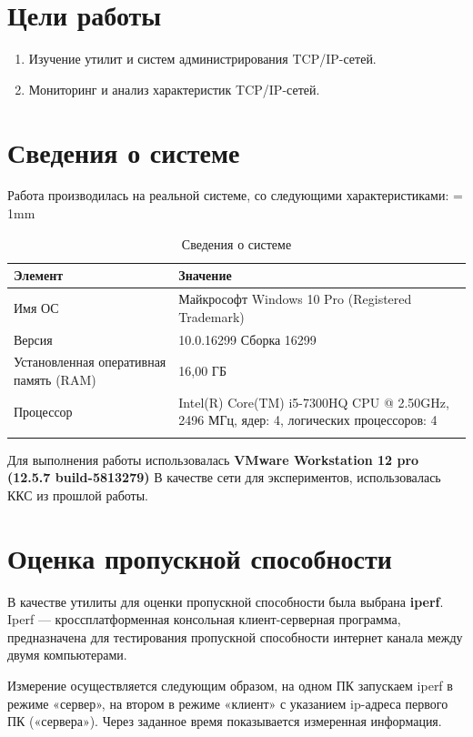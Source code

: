\documentclass[a4paper, 12pt]{article}		%
\begin{document}


%
\section{Цели работы}
\begin{enumerate}
\item Изучение утилит и систем администрирования TCP/IP-сетей.
\item Мониторинг и анализ характеристик TCP/IP-сетей.
\end{enumerate}

\section{Сведения о системе}
Работа производилась на реальной системе, со следующими характеристиками:
\tabulinesep = 1mm
\begin{longtabu} to \textwidth {|X[10, c , m ] |X[25, c , m ] | }\firsthline\hline

\textbf{Элемент}&\textbf{Значение}\\ \hline \endfirsthead
	
Имя ОС&Майкрософт Windows 10 Pro (Registered Trademark)\\ \hline
Версия&10.0.16299 Сборка 16299\\ \hline
Установленная оперативная память (RAM) &16,00 ГБ\\ \hline
Процессор&Intel(R) Core(TM) i5-7300HQ CPU @ 2.50GHz, 2496 МГц, ядер: 4, логических процессоров: 4\\ \hline
\caption{Сведения о системе}
\end{longtabu}
Для выполнения работы использовалась \textbf{VMware Workstation 12 pro (12.5.7 build-5813279)}
В качестве сети для экспериментов, использовалась ККС из прошлой работы.

\section{Оценка пропускной способности}
В качестве утилиты для оценки пропускной способности была выбрана \textbf{iperf}.  Iperf — кроссплатформенная консольная клиент-серверная программа, предназначена для тестирования пропускной способности интернет канала между двумя компьютерами.

Измерение осуществляется следующим образом, на одном ПК запускаем iperf в режиме «сервер», на втором в режиме «клиент» с указанием ip-адреса первого ПК («сервера»). Через заданное время показывается измеренная информация. 
\end{document}

